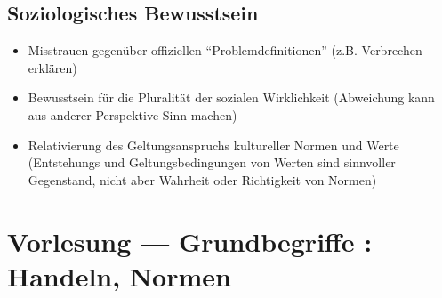 \documentclass[a4paper, 12pt]{scrartcl}
\newcommand{\Romann}[1]{\uppercase\expandafter{\romannumeral#1}}
\begin{document}
\subsection{Soziologisches Bewusstsein}
\begin{itemize}
	\item
		Misstrauen gegenüber offiziellen \enquote{Problemdefinitionen} (z.B. Verbrechen erklären)
	\item
		Bewusstsein für die Pluralität der sozialen Wirklichkeit (Abweichung kann aus anderer Perspektive Sinn machen)
	\item
		Relativierung des Geltungsanspruchs kultureller Normen und Werte (Entstehungs und Geltungsbedingungen von Werten sind sinnvoller Gegenstand, nicht aber Wahrheit oder Richtigkeit von Normen)
\end{itemize}

\section{Vorlesung \Romann{3} --- Grundbegriffe \Romann{1}: Handeln, Normen}
\end{document}
